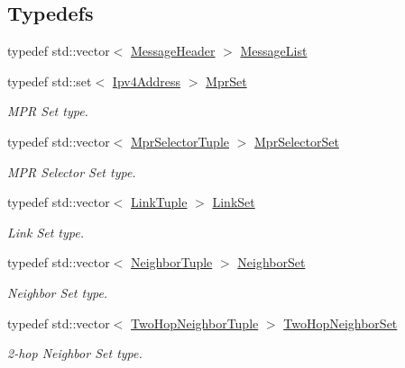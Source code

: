 \subsection*{Typedefs}
\begin{DoxyCompactItemize}
\item 
typedef std\+::vector$<$ \hyperlink{classns3_1_1olsr_1_1MessageHeader}{Message\+Header} $>$ \hyperlink{namespacens3_1_1olsr_af17c710718a5637d01f37804a0a53e78}{Message\+List}
\item 
typedef std\+::set$<$ \hyperlink{classns3_1_1Ipv4Address}{Ipv4\+Address} $>$ \hyperlink{namespacens3_1_1olsr_aa7c4ede0ba85f0ea9da6e6699525bd4a}{Mpr\+Set}
\begin{DoxyCompactList}\small\item\em M\+PR Set type. \end{DoxyCompactList}\item 
typedef std\+::vector$<$ \hyperlink{structns3_1_1olsr_1_1MprSelectorTuple}{Mpr\+Selector\+Tuple} $>$ \hyperlink{namespacens3_1_1olsr_a320f5a705b7edfac35236d3e28e10e59}{Mpr\+Selector\+Set}
\begin{DoxyCompactList}\small\item\em M\+PR Selector Set type. \end{DoxyCompactList}\item 
typedef std\+::vector$<$ \hyperlink{structns3_1_1olsr_1_1LinkTuple}{Link\+Tuple} $>$ \hyperlink{namespacens3_1_1olsr_a60381cc41d65a2e0daabd286077a378a}{Link\+Set}
\begin{DoxyCompactList}\small\item\em Link Set type. \end{DoxyCompactList}\item 
typedef std\+::vector$<$ \hyperlink{structns3_1_1olsr_1_1NeighborTuple}{Neighbor\+Tuple} $>$ \hyperlink{namespacens3_1_1olsr_af0afef1f28c6f0a0b528b03b638df05d}{Neighbor\+Set}
\begin{DoxyCompactList}\small\item\em Neighbor Set type. \end{DoxyCompactList}\item 
typedef std\+::vector$<$ \hyperlink{structns3_1_1olsr_1_1TwoHopNeighborTuple}{Two\+Hop\+Neighbor\+Tuple} $>$ \hyperlink{namespacens3_1_1olsr_a5f9963792af7fea4dc66fb8718394604}{Two\+Hop\+Neighbor\+Set}
\begin{DoxyCompactList}\small\item\em 2-\/hop Neighbor Set type. \end{DoxyCompactList}\item 

\end{DoxyCompactItemize}
